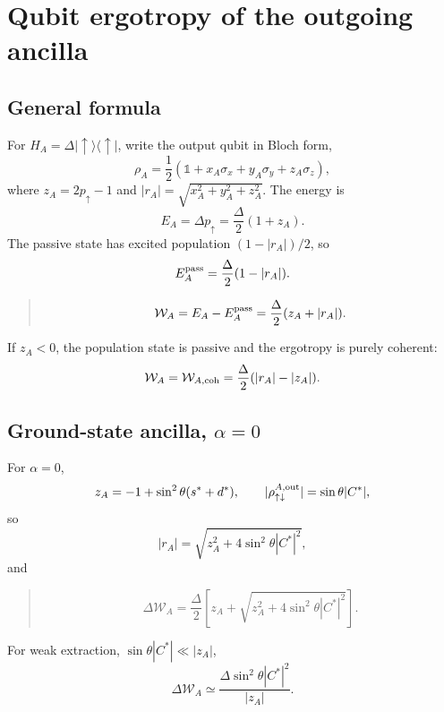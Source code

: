 \documentclass[11pt,a4paper]{article}
\newcommand{\proj}[1]{|#1\rangle\langle #1|}
\newcommand{\id}{\mathbb{1}}
\newcommand{\W}{\mathcal{W}}
\newenvironment{resultbox}{\begin{quote}\small\color{blue!40!black}}{\end{quote}}
\begin{document}
\section{Qubit ergotropy of the outgoing ancilla}\label{sec:ergotropy}

\subsection{General formula}

For $H_A=\Delta\proj{\uparrow}$, write the output qubit in Bloch form,
\begin{equation}
\rho_A=\frac12(\id+x_A\sigma_x+y_A\sigma_y+z_A\sigma_z),
\end{equation}
where $z_A=2p_\uparrow-1$ and $|r_A|=\sqrt{x_A^2+y_A^2+z_A^2}$. The energy is
\begin{equation}
E_A=\Delta p_\uparrow=\frac{\Delta}{2}(1+z_A).
\end{equation}
The passive state has excited population $(1-|r_A|)/2$, so
\begin{equation}
E_A^{\rm pass}=\frac{\Delta}{2}(1-|r_A|).
\end{equation}
\begin{resultbox}
\begin{equation}
\W_A=E_A-E_A^{\rm pass}=\frac{\Delta}{2}(z_A+|r_A|).
\end{equation}
\end{resultbox}
If $z_A<0$, the population state is passive and the ergotropy is purely coherent:
\begin{equation}
\W_A=\W_{A,{\rm coh}}=\frac{\Delta}{2}(|r_A|-|z_A|).
\end{equation}

\subsection{Ground-state ancilla, $\alpha=0$}

For $\alpha=0$,
\begin{equation}
z_A=-1+\sin^2\theta(s^*+d^*),
\qquad
|\rho_{\uparrow\downarrow}^{A,{\rm out}}|=\sin\theta|C^*|,
\end{equation}
so
\begin{equation}
|r_A|=\sqrt{z_A^2+4\sin^2\theta|C^*|^2},
\end{equation}
and
\begin{resultbox}
\begin{equation}
\Delta\W_A=\frac{\Delta}{2}\left[z_A+\sqrt{z_A^2+4\sin^2\theta|C^*|^2}\right].
\end{equation}
\end{resultbox}
For weak extraction, $\sin\theta|C^*|\ll |z_A|$,
\begin{equation}
\Delta\W_A\simeq \frac{\Delta\sin^2\theta|C^*|^2}{|z_A|}.
\end{equation}
\end{document}
